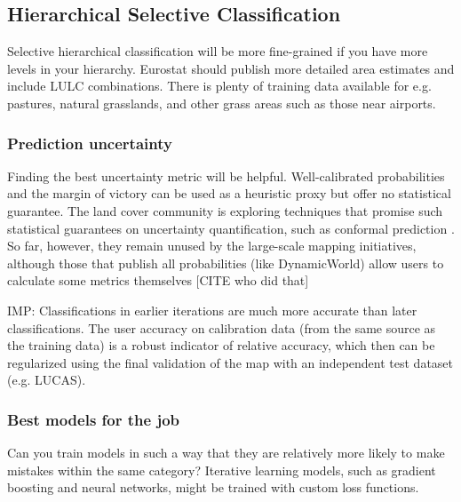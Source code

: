     
    \subsection{Hierarchical Selective Classification}
    
        Selective hierarchical classification will be more fine-grained if you have more levels in your hierarchy.
        Eurostat should publish more detailed area estimates and include LULC combinations. There is plenty of training data available for e.g. pastures, natural grasslands, and other grass areas such as those near airports.

        \subsubsection{Prediction uncertainty}
        
            Finding the best uncertainty metric will be helpful. Well-calibrated probabilities and the margin of victory \citep{calderon-loor2021high} can be used as a heuristic proxy but offer no statistical guarantee. The land cover community is exploring techniques that promise such statistical guarantees on uncertainty quantification, such as conformal prediction \citep{angelopoulos2023predictionpowered,valle2023quantifying,singh2024uncertainty}. So far, however, they remain unused by the large-scale mapping initiatives, although those that publish all probabilities (like DynamicWorld) allow users to calculate some metrics themselves [CITE who did that]
        
            IMP: Classifications in earlier iterations are much more accurate than later classifications. The user accuracy on calibration data (from the same source as the training data) is a robust indicator of relative accuracy, which then can be regularized using the final validation of the map with an independent test dataset (e.g. LUCAS).
    
        \subsubsection{Best models for the job}
                Can you train models in such a way that they are relatively more likely to make mistakes within the same category? Iterative learning models, such as gradient boosting and neural networks, might be trained with custom loss functions.

    
